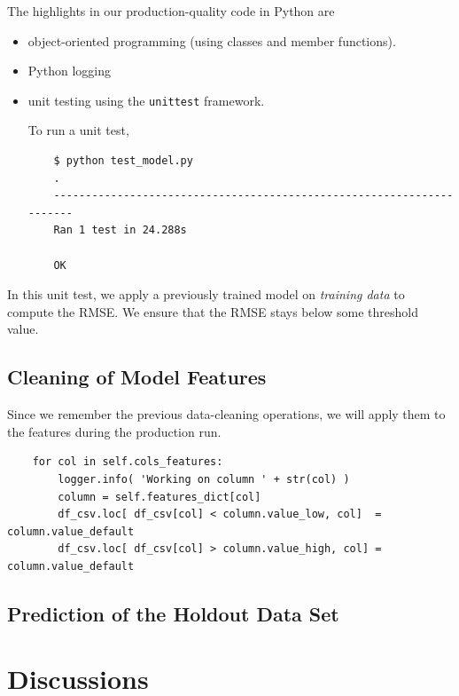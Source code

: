 \documentclass[12pt]{article}
\begin{document}
The highlights in our production-quality code in Python are
\begin{itemize}
  \item object-oriented programming (using classes and member functions).

  \item Python logging


  \item unit testing using the \texttt{unittest} framework.

  To run a unit test,
  \begin{verbatim}
    $ python test_model.py 
    .
    ----------------------------------------------------------------------
    Ran 1 test in 24.288s

    OK
  \end{verbatim}
\end{itemize}
  In this unit test, we apply a previously trained model on \textit{training data} to compute the RMSE. We ensure that the RMSE stays below some threshold value.

\subsection{Cleaning of Model Features}

Since we remember the previous data-cleaning operations, we will apply them to the features during the production run.

      \begin{verbatim}
    for col in self.cols_features:
        logger.info( 'Working on column ' + str(col) )
        column = self.features_dict[col]
        df_csv.loc[ df_csv[col] < column.value_low, col]  = column.value_default
        df_csv.loc[ df_csv[col] > column.value_high, col] = column.value_default
      \end{verbatim}

\subsection{Prediction of the Holdout Data Set}


\section{Discussions}
\end{document}
